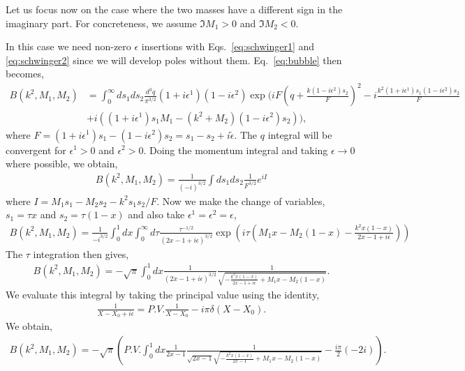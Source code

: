 \documentclass[twoside]{article}
\begin{document}
Let us focus now on the case where the two masses have a different sign in the imaginary part. For concreteness, we assume $\Im M_1 > 0$ and $\Im M_2 < 0$.

In this case we need non-zero $\epsilon$ insertions with Eqs.~\eqref{eq:schwinger1} and \eqref{eq:schwinger2} since we will develop poles without them. Eq.~\eqref{eq:bubble} then becomes,
\begin{align}
 B(k^2, M_1, M_2) &= \int_0^\infty ds_1 ds_2\frac{d^3q}{\pi^{3/2}}(1 + i\epsilon^1)(1 - i\epsilon^2)\exp\Big( iF\left( q + \frac{k(1 - i\epsilon^2)s_2}{F} \right)^2 - i\frac{k^2(1+i\epsilon^1) s_1 (1-i\epsilon^2) s_2}{F} \nonumber \\
&+ i\left( (1 + i\epsilon^1)s_1 M_1 - (k^2 + M_2)(1 - i\epsilon^2)s_2 \right) \Big),
\end{align}
where $F = (1 + i\epsilon^1)s_1 - (1-i\epsilon^2)s_2 = s_1 - s_2 + i \tilde{\epsilon}$. The $q$ integral will be convergent for $\epsilon^1 > 0$ and $\epsilon^2 > 0$. Doing the momentum integral and taking $\epsilon \rightarrow 0$ where possible, we obtain,
\begin{align}
  B(k^2, M_1,M_2) = \frac{1}{(-i)^{3/2}}\int ds_1ds_2\frac{1}{F^{3/2}}e^{iI}
\end{align}
where $I = M_1 s_1 - M_2 s_2 - k^2 s_1s_2/F$. Now we make the
change of variables, $s_1 = \tau x$ and $s_2 = \tau(1-x)$ and also take $\epsilon^1 = \epsilon^2 = \epsilon$,
\begin{align}
  B(k^2,M_1,M_2) = \frac{1}{-i^{3/2}}\int^1_0dx\int^{\infty}_0d\tau \frac{\tau^{-1/2}}{(2x-1 + i\epsilon)^{3/2}}\exp\left( i\tau\left(
      M_1 x - M_2(1-x) - \frac{k^2x(1-x)}{2x-1 + i\epsilon}
  \right)\right)
\end{align}
The $\tau$ integration then gives,
\begin{align}
 B(k^2,M_1,M_2) =   -\sqrt{\pi}\int^1_0dx \frac{1}{(2x - 1 + i\epsilon)^{3/2}}\frac{1}{\sqrt{-\frac{k^2x(1-x)}{2x-1+ i\epsilon} + M_1x - M_2(1-x)}}.
\end{align}
We evaluate this integral by taking the principal value using the identity,
\begin{align}
  \frac{1}{X - X_0+ i\epsilon} = P.V.\frac{1}{X-X_0} - i\pi \delta(X- X_0) .
\end{align}
We obtain,
\begin{align}
\label{eq:PVintegral}
 B(k^2,M_1,M_2) = -\sqrt{\pi}\left(P.V. \int^1_0dx \frac{1}{2x - 1}\frac{1}{\sqrt{2x - 1}\sqrt{-\frac{k^2x(1-x)}{2x-1} + M_1x - M_2(1-x)}} -\frac{i \pi}{2} (-2 i) \right).
\end{align}
\end{document}
